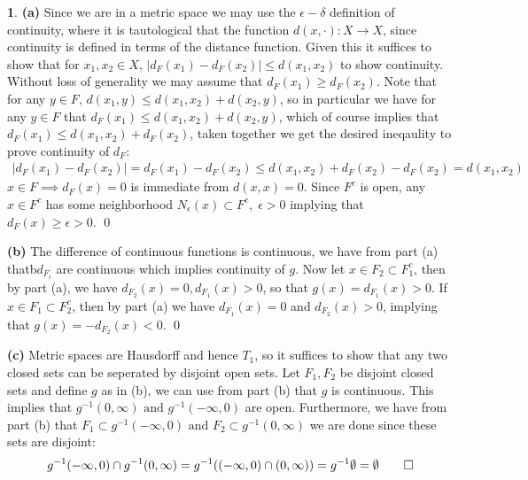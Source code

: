 \documentclass[10.5pt]{article}
\theoremstyle{definition}
\newtheorem{pb}{}
\newcommand{\abs}[1]{\left\vert#1\right\vert}
\newcommand{\tand}{\text{ and }}
\begin{document}
    \begin{pb}
        \textbf{(a)} Since we are in a metric space we may use the \(\epsilon-\delta\) definition of continuity, where it is tautological that the function \(d(x,\cdot):X \to X\), since continuity is defined in terms of the distance function. Given this it suffices to show that for \(x_1,x_2 \in X\), \(\abs{d_F(x_1) - d_F(x_2)} \leq d(x_1,x_2)\) to show continuity. Without loss of generality we may assume that \(d_F(x_1) \geq d_F(x_2)\). Note that for any \(y \in F\), \(d(x_1,y) \leq d(x_1,x_2) + d(x_2,y)\), so in particular we have for any \(y \in F\) that \(d_F(x_1) \leq d(x_1,x_2) + d(x_2,y)\), which of course implies that \(d_F(x_1) \leq d(x_1,x_2) + d_F(x_2)\), taken together we get the desired ineqaulity to prove continuity of \(d_F\):
        \begin{align*}
            \abs{d_F(x_1) - d_F(x_2)} = d_F(x_1) - d_F(x_2) \leq d(x_1,x_2) + d_F(x_2) - d_F(x_2) = d(x_1,x_2)
        \end{align*}
        \(x \in F \implies d_F(x) = 0\) is immediate from \(d(x,x) = 0\). Since \(F^c\) is open, any \(x \in F^c\) has some neighborhood \(N_\epsilon(x) \subset F^c, \; \epsilon > 0\) implying that \(d_F(x) \geq \epsilon > 0\). \qed
        
        \textbf{(b)} The difference of continuous functions is continuous, we have from part (a) thatb\(d_{F_i}\) are continuous which implies continuity of \(g\). Now let \(x \in F_2 \subset F_1^c\), then by part (a), we have \(d_{F_2}(x) = 0, d_{F_1}(x) > 0\), so that \(g(x) = d_{F_1}(x) > 0\). If \(x \in F_1 \subset F_2^c\), then by part (a) we have \(d_{F_1}(x) = 0\) and \(d_{F_2}(x) > 0\), implying that \(g(x) = -d_{F_2}(x) < 0\). \qed

        \textbf{(c)} Metric spaces are Hausdorff and hence \(T_1\), so it suffices to show that any two closed sets can be seperated by disjoint open sets. Let \(F_1, F_2\) be disjoint closed sets and define \(g\) as in (b), we can use from part (b) that \(g\) is continuous. This implies that
        \(g^{-1}(0,\infty) \tand g^{-1}(-\infty,0)\) are open.  Furthermore, we have from part (b) that \(F_1 \subset g^{-1}(-\infty,0) \tand F_2 \subset g^{-1}(0,\infty)\) we are done since these sets are disjoint:
        \begin{align*}
            g^{-1}(-\infty,0)\cap g^{-1}(0,\infty) = g^{-1}((-\infty,0)\cap(0,\infty)) = g^{-1}\emptyset = \emptyset \qed
        \end{align*}
    \end{pb}
\end{document}
